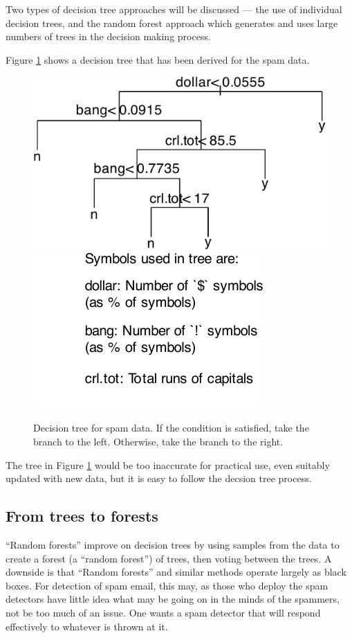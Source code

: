 \documentclass[
  10pt,
  b5paper]{book}
\begin{document}
Two types of decision tree approaches will be discussed
--- the use of individual decision trees, and the
random forest approach which generates and uses large
numbers of trees in the decision making process.

Figure \ref{fig:spam} shows a decision tree that has been derived
for the spam data.

\begin{figure}[H]

{\centering \includegraphics[width=0.48\linewidth]{08-observational_files/figure-latex/spam-1} \includegraphics[width=0.48\linewidth]{08-observational_files/figure-latex/spam-2} 

}

\caption{Decision tree for spam data. If the condition is satisfied, take
               the branch to the left.  Otherwise, take the branch to the right.}\label{fig:spam}
\end{figure}

The tree in Figure \ref{fig:spam} would be too inaccurate
for practical use, even suitably updated with new data,
but it is easy to follow the decsion tree process.

\hypertarget{from-trees-to-forests}{%
\subsection*{From trees to forests}\label{from-trees-to-forests}}

``Random forests'' improve on decision trees by using samples from
the data to create a forest (a ``random forest'') of trees, then
voting between the trees. A downside is that ``Random forests''
and similar methods operate largely as black boxes. For
detection of spam email, this may, as those who deploy the
spam detectors have little idea what may be going on in the
minds of the spammers, not be too much of an issue. One
wants a spam detector that will respond effectively to
whatever is thrown at it.
\end{document}
